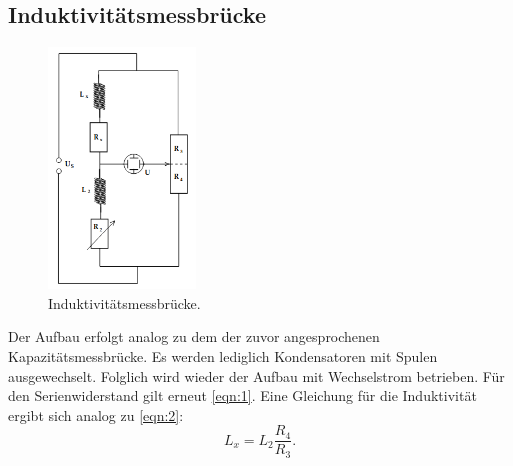 \subsection{Induktivitätsmessbrücke}
\begin{figure}[H]
    \centering
        \centering
        \includegraphics[width=0.35\textwidth]{Bilder/induktivitaetsmess.png}
        \caption{Induktivitätsmessbrücke. \cite{anleitung}}
    \hfill
    \label{fig:f4}
\end{figure}
\noindent Der Aufbau erfolgt analog zu dem der zuvor angesprochenen 
Kapazitätsmessbrücke. Es werden lediglich Kondensatoren mit Spulen ausgewechselt.
Folglich wird wieder der Aufbau mit Wechselstrom betrieben. Für den Serienwiderstand 
gilt erneut \autoref{eqn:1}. Eine Gleichung für die Induktivität ergibt sich 
analog zu \autoref{eqn:2}:
\begin{equation}
    L_x = L_2 \frac{R_4}{R_3}.
\end{equation}

